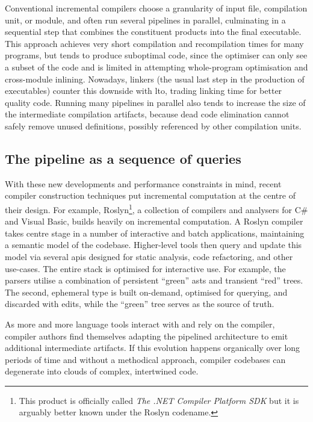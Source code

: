Conventional incremental compilers choose a granularity of input file,
compilation unit, or module, and often run several pipelines in parallel,
culminating in a sequential step that combines the constituent products into the
final executable. This approach achieves very short compilation and
recompilation times for many programs, but tends to produce suboptimal code,
since the optimiser can only see a subset of the code and is limited in
attempting whole-program optimisation and cross-module inlining. Nowadays,
linkers (the usual last step in the production of executables) counter this
downside with \acrfull{lto}, trading linking time for better quality code.
Running many pipelines in parallel also tends to increase the size of the
intermediate compilation artifacts, because dead code elimination cannot safely
remove unused definitions, possibly referenced by other compilation units.

\subsection{The pipeline as a sequence of queries}

With these new developments and performance constraints in mind, recent compiler
construction techniques put incremental computation at the centre of their
design. For example, Roslyn\footnote{This product is officially called \emph{The
.NET Compiler Platform SDK} but it is arguably better known under the Roslyn
codename.}, a collection of compilers and analysers for C\# and Visual Basic,
builds heavily on incremental computation. A Roslyn compiler takes centre stage
in a number of interactive and batch applications, maintaining a semantic model
of the codebase. Higher-level tools then query and update this model via several
\acrshort{api}s designed for static analysis, code refactoring, and other
use-cases\cite{roslyn-apis}. The entire stack is optimised for interactive use. For example, the
parsers utilise a combination of persistent ``green'' \acrlong{ast}s and
transient ``red'' trees. The second, ephemeral type is built on-demand,
optimised for querying, and discarded with edits\cite{roslyn-red-green-trees},
while the ``green'' tree serves as the source of truth.

As more and more language tools interact with and rely on the compiler, compiler
authors find themselves adapting the pipelined architecture to emit additional
intermediate artifacts. If this evolution happens organically over long periods
of time and without a methodical approach, compiler codebases can degenerate
into clouds of complex, intertwined code.

